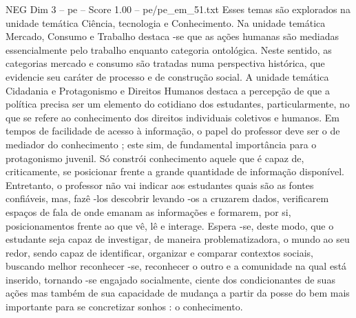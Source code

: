 \begin{textsample}{NEG Dim 3 – pe – Score 1.00 – pe/pe\_em\_51.txt}
Esses temas são explorados na unidade temática Ciência, tecnologia e Conhecimento.
Na unidade temática Mercado, Consumo e Trabalho destaca -se que as ações humanas são mediadas essencialmente pelo trabalho enquanto categoria ontológica.
Neste sentido, as categorias mercado e consumo são tratadas numa perspectiva histórica, que evidencie seu caráter de processo e de construção social.
A unidade temática Cidadania e Protagonismo e Direitos Humanos destaca a percepção de que a política precisa ser um elemento do cotidiano dos estudantes, particularmente, no que se refere ao conhecimento dos direitos individuais coletivos e humanos.
Em tempos de facilidade de acesso à informação, o papel do professor deve ser o de mediador do conhecimento ; este sim, de fundamental importância para o protagonismo juvenil.
Só constrói conhecimento aquele que é capaz de, criticamente, se posicionar frente a grande quantidade de informação disponível.
Entretanto, o professor não vai indicar aos estudantes quais são as fontes confiáveis, mas, fazê -los descobrir levando -os a cruzarem dados, verificarem espaços de fala de onde emanam as informações e formarem, por si, posicionamentos frente ao que vê, lê e interage.
Espera -se, deste modo, que o estudante seja capaz de investigar, de maneira problematizadora, o mundo ao seu redor, sendo capaz de identificar, organizar e comparar contextos sociais, buscando melhor reconhecer -se, reconhecer o outro e a comunidade na qual está inserido, tornando -se engajado socialmente, ciente dos condicionantes de suas ações mas também de sua capacidade de mudança a partir da posse do bem mais importante para se concretizar sonhos : o conhecimento.

\end{textsample}
